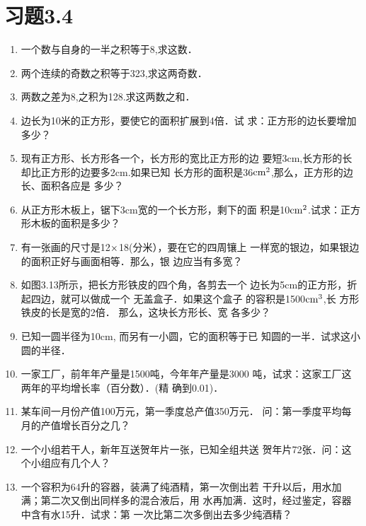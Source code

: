\section*{习题3.4}

\begin{enumerate}
\item 一个数与自身的一半之积等于8,求这数．
\item 两个连续的奇数之积等于323,求这两奇数．
\item 两数之差为8,之积为128.求这两数之和．
\item 边长为10米的正方形，要使它的面积扩展到4倍．试
求：正方形的边长要增加多少？
\item 现有正方形、长方形各一个，长方形的宽比正方形的边
要短3cm,长方形的长却比正方形的边要多2cm.如果已知
长方形的面积是36${\rm cm}^2$,那么，正方形的边长、面积各应是
多少？
\item 从正方形木板上，锯下3cm宽的一个长方形，剩下的面
积是10${\rm cm}^2$.试求：正方形木板的面积是多少？
\item 有一张画的尺寸是12$\times$18(分米），要在它的四周镶上
一样宽的银边，如果银边的面积正好与画面相等．那么，银
边应当有多宽？
\item 如图3.13所示，把长方形铁皮的四个角，各剪去一个
边长为5cm的正方形，折
起四边，就可以做成一个
无盖盒子．如果这个盒子
的容积是1500${\rm cm}^3$,长
方形铁皮的长是宽的2倍．
那么，这块长方形长、宽
各多少？
\begin{figure}[htp]
    \centering
{}
    \caption{}
\end{figure}

\item 已知一圆半径为10cm, 而另有一小圆，它的面积等于已
知圆的一半．试求这小圆的半径．
\item 一家工厂，前年年产量是1500吨，今年年产量是3000
吨，试求：这家工厂这两年的平均增长率（百分数）．(精
确到0.01)．
\item 某车间一月份产值100万元，第一季度总产值350万元．
问：第一季度平均每月的产值增长百分之几？
\item 一个小组若干人，新年互送贺年片一张，已知全组共送
贺年片72张．问：这个小组应有几个人？
\item 一个容积为64升的容器，装满了纯酒精，第一次倒出若
干升以后，用水加满；第二次又倒出同样多的混合液后，用
水再加满．这时，经过鉴定，容器中含有水15升．试求：第
一次比第二次多倒出去多少纯酒精？
\end{enumerate}

